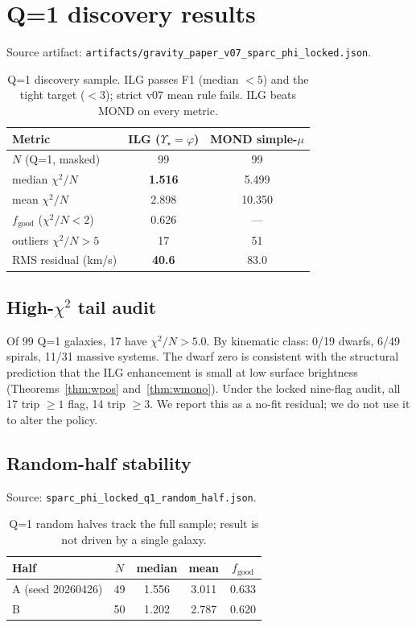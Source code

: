 \documentclass[11pt,a4paper]{article}
\newcommand{\Ystar}{\ensuremath{\Upsilon_{\star}}}
\newcommand{\chiN}{\ensuremath{\chi^{2}/N}}
\theoremstyle{plain}
\theoremstyle{definition}
\begin{document}
\section{Q=1 discovery results}
Source artifact: \texttt{artifacts/gravity\_paper\_v07\_sparc\_phi\_locked.json}.

\begin{table}[h]
\centering\small
\begin{tabular}{lcc}
\toprule
Metric & ILG ($\Ystar=\varphi$) & MOND simple-$\mu$ \\
\midrule
$N$ (Q=1, masked) & 99 & 99 \\
median $\chiN$ & \textbf{1.516} & 5.499 \\
mean $\chiN$ & 2.898 & 10.350 \\
$f_{\mathrm{good}}$ ($\chiN < 2$) & 0.626 & --- \\
outliers $\chiN > 5$ & 17 & 51 \\
RMS residual (km/s) & \textbf{40.6} & 83.0 \\
\bottomrule
\end{tabular}
\caption{Q=1 discovery sample. ILG passes F1 (median $<5$) and the tight target ($<3$); strict v07 mean rule fails. ILG beats MOND on every metric.}
\end{table}

\subsection{High-$\chi^2$ tail audit}
Of 99 Q=1 galaxies, 17 have $\chiN > 5.0$. By kinematic class: 0/19 dwarfs, 6/49 spirals, 11/31 massive systems. The dwarf zero is consistent with the structural prediction that the ILG enhancement is small at low surface brightness (Theorems~\ref{thm:wpos} and~\ref{thm:wmono}). Under the locked nine-flag audit, all 17 trip $\geq 1$ flag, 14 trip $\geq 3$. We report this as a no-fit residual; we do not use it to alter the policy.

\subsection{Random-half stability}
Source: \texttt{sparc\_phi\_locked\_q1\_random\_half.json}.

\begin{table}[h]
\centering\small
\begin{tabular}{lcccc}
\toprule
Half & $N$ & median & mean & $f_{\mathrm{good}}$ \\
\midrule
A (seed 20260426) & 49 & 1.556 & 3.011 & 0.633 \\
B & 50 & 1.202 & 2.787 & 0.620 \\
\bottomrule
\end{tabular}
\caption{Q=1 random halves track the full sample; result is not driven by a single galaxy.}
\end{table}
\end{document}
